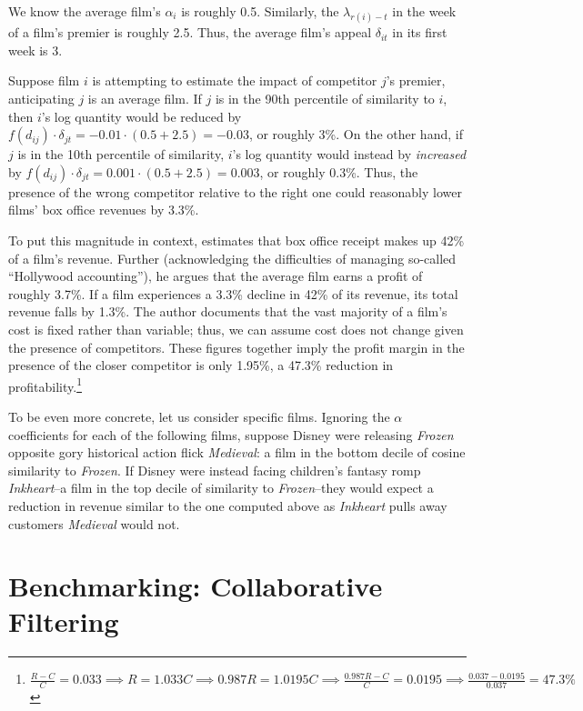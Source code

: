 \documentclass{article}
\begin{document}
We know the average film's $\alpha_i$ is roughly 0.5. Similarly, the $\lambda_{r(i) - t}$ in the week of a film's premier is roughly 2.5. Thus, the average film's appeal $\delta_{it}$ in its first week is 3. 

Suppose film $i$ is attempting to estimate the impact of competitor $j$'s premier, anticipating $j$ is an average film. If $j$ is in the 90th percentile of similarity to $i$, then $i$'s log quantity would be reduced by $f(d_{ij}) \cdot \delta_{jt} = -0.01 \cdot (0.5 + 2.5) = -0.03$, or roughly 3\%. On the other hand, if $j$ is in the 10th percentile of similarity, $i$'s log quantity would instead by \emph{increased} by $f(d_{ij}) \cdot \delta_{jt} = 0.001 \cdot (0.5 + 2.5) = 0.003$, or roughly 0.3\%. Thus, the presence of the wrong competitor relative to the right one could reasonably lower films' box office revenues by 3.3\%.

To put this magnitude in context, \textcite{follows2016SF,follows2016SFa} estimates that box office receipt makes up 42\% of a film's revenue. Further (acknowledging the difficulties of managing so-called ``Hollywood accounting''), he argues that the average film earns a profit of roughly 3.7\%. If a film experiences a 3.3\% decline in 42\% of its revenue, its total revenue falls by 1.3\%. The author documents that the vast majority of a film's cost is fixed rather than variable; thus, we can assume cost does not change given the presence of competitors. These figures together imply the profit margin in the presence of the closer competitor is only 1.95\%, a 47.3\% reduction in profitability.\footnote{$\frac{R - C}{C} = 0.033 \implies R = 1.033C \implies 0.987 R = 1.0195 C \implies \frac{0.987R - C}{C} = 0.0195 \implies \frac{0.037 - 0.0195}{0.037} = 47.3\%$} 

To be even more concrete, let us consider specific films. Ignoring the $\alpha$ coefficients for each of the following films, suppose Disney were releasing \emph{Frozen} opposite gory historical action flick \emph{Medieval}: a film in the bottom decile of cosine similarity to \emph{Frozen}. If Disney were instead facing children's fantasy romp \emph{Inkheart}--a film in the top decile of similarity to \emph{Frozen}--they would expect a reduction in revenue similar to the one computed above as \emph{Inkheart} pulls away customers \emph{Medieval} would not. 


\section{Benchmarking: Collaborative Filtering}
\end{document}
